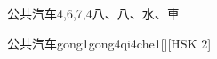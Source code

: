 \begin{entry}{公共汽车}{4,6,7,4}{⼋、⼋、⽔、⾞}
  \begin{phonetics}{公共汽车}{gong1gong4qi4che1}[][HSK 2]
  \end{phonetics}
\end{entry}
